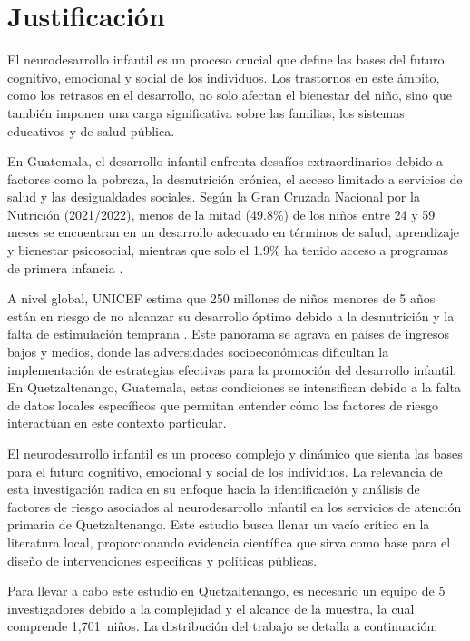 \documentclass[11pt,letterpaper]{report}
\newcommand{\muestradeseada}{1,701}
\begin{document}
	\chapter{Justificación}
El neurodesarrollo infantil es un proceso crucial que define las bases del 
futuro cognitivo, emocional y social de los individuos. Los trastornos en este
ámbito, como los retrasos en el desarrollo, no solo afectan el bienestar del
niño, sino que también imponen una carga significativa sobre las familias, los
sistemas educativos y de salud pública.

En Guatemala, el desarrollo infantil enfrenta desafíos extraordinarios debido a
factores como la pobreza, la desnutrición crónica, el acceso limitado a
servicios de salud y las desigualdades sociales. Según la Gran Cruzada Nacional
por la Nutrición (2021/2022), menos de la mitad (49.8\%) de los niños entre 24
y 59 meses se encuentran en un desarrollo adecuado en términos de salud,
aprendizaje y bienestar psicosocial, mientras que solo el 1.9\% ha tenido
acceso a programas de primera infancia \cite{SESAN2022}.

A nivel global, UNICEF estima que 250 millones de niños menores de 5 años están
en riesgo de no alcanzar su desarrollo óptimo debido a la desnutrición y la
falta de estimulación temprana \cite{UNICEF2023}. Este panorama se agrava en
países de ingresos bajos y medios, donde las adversidades socioeconómicas
dificultan la implementación de estrategias efectivas para la promoción del
desarrollo infantil. En Quetzaltenango, Guatemala, estas condiciones se
intensifican debido a la falta de datos locales específicos que permitan
entender cómo los factores de riesgo interactúan en este contexto particular.

El neurodesarrollo infantil es un proceso complejo y dinámico que sienta las
bases para el futuro cognitivo, emocional y social de los individuos. La
relevancia de esta investigación radica en su enfoque hacia la identificación y
análisis de factores de riesgo asociados al neurodesarrollo infantil en los
servicios de atención primaria de Quetzaltenango. Este estudio busca llenar un
vacío crítico en la literatura local, proporcionando evidencia científica que
sirva como base para el diseño de intervenciones específicas y políticas
públicas.

Para llevar a cabo este estudio en Quetzaltenango, es necesario un equipo de 5
investigadores debido a la complejidad y el alcance de la muestra, la cual
comprende \muestradeseada\ niños. La distribución del trabajo se detalla a
continuación:
\end{document}
